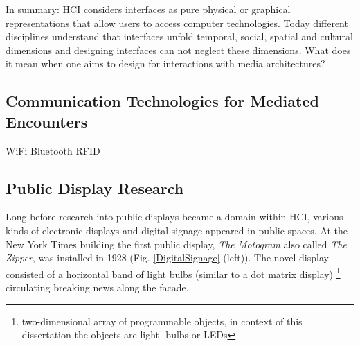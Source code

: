In summary: HCI considers interfaces as pure physical or graphical representations that allow users to access computer technologies. Today different disciplines understand that interfaces unfold temporal, social, spatial and cultural dimensions and designing interfaces can not neglect these dimensions.
What does it mean when one aims to design for interactions with media architectures?




\subsection{Communication Technologies for Mediated Encounters}

WiFi
Bluetooth
RFID


\subsection{Public Display Research}

Long before research into public displays  became a domain within HCI, various kinds of electronic displays and digital signage appeared in public spaces.
At the New York Times building the first public display, \textit{The Motogram}  also called \textit{The Zipper}, was installed in 1928 (Fig. \ref{DigitalSignage} (left)). The novel display consisted of a horizontal band of light bulbs (similar to a dot matrix display) \footnote{two-dimensional array of programmable objects, in context of this dissertation the objects are light- bulbs or LEDs} circulating breaking news along the facade. 

